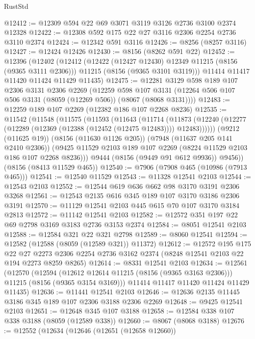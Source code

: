 \begin{lexlean}{RustStd}
\begin{coremodule}
{\begin{coremodule}
{{{{{{{{{{{{{{{{{{{{{{{{{{{{{{{{{{@12412 := @12309 @594 @22 @69 @3071 @3119 @3126 @2736 @3100 @2374 @12328
@12422 := @12308 @592 @175 @22 @27 @3116 @2306 @2254 @2736 @3110 @2374
@12424 := @12342 @591 @3116
@12426 := @8256 (@8257 @3116)
@12427 := @12424 @12426
@12430 := @8156 (@8262 @591 @22)
@12452 := @12396
    (@12402
      (@12412
        (@12422 (@12427 @12430) @12349 @11215 (@8156 (@9365 @3111 @2306)))
        @11215
        (@8156 (@9365 @3101 @3119)))
      @11414
      @11417
      @11420
      @11424
      @11429
      @11435)
@12475 := @12281
    @3129
    @598
    @189
    @107
    @2306
    @3131
    @2306
    @2269
    (@12259
      @598
      @107
      @3131
      (@12264 @506 @107 @506 @3131 (@8059 (@12269 @506)) (@8067 (@8068 @3131))))
@12483 := @12259 @189 @107 @2269 (@12382 @186 @107 @2268 @8236)
@12535 := @11542
    (@11548
      (@11575
        (@11593
          (@11643
            (@11714
              (@11873
                (@12240 (@12277 (@12289 (@12369 (@12388 (@12452 (@12475 @12483)))) @12483))))))
          (@9212 (@11625 @19))
          (@8156 (@11630 @1126 @205))
          (@7948 (@11637 @205 @141 @2410 @2306))
          (@9425 @11529 @2103 @189 @107 @2269 (@8224 @11529 @2103 @186 @107 @2268 @8236)))
        @9444
        (@8156 (@9449 @91 @612 @9936))
        @9456))
    (@8156 (@8413 @11529 @465))
@12540 := @7906 (@7908 @465 (@10986 (@7913 @465)))
@12541 := @12540 @11529
@12543 := @11328 @12541 @2103
@12544 := @12543 @2103
@12552 := @12544 @619 @636 @662 @98 @3170 @3191 @2306 @3268
@12561 := @12543 @2135 @616 @345 @189 @107 @3170 @3186 @2306 @3191
@12570 := @11129 @12541 @2103 @445 @615 @70 @107 @3170 @3184 @2813
@12572 := @11142 @12541 @2103
@12582 := @12572 @351 @197 @22 @69 @2798 @3169 @3183 @2736 @3153 @2374
@12584 := @8051 @12541 @2103
@12588 := @12584 @321 @22 @321 @2798
@12589 := @8060 @12541
@12594 := @12582 (@12588 (@8059 (@12589 @321)) @11372)
@12612 := @12572
    @195
    @175
    @22
    @27
    @2273
    @2306
    @2254
    @2736
    @3162
    @2374
    (@8248 @12541 @2103 @22 @194 @2273 @8259 @8265)
@12614 := @8331 @12541 @2103
@12634 := @12561
    (@12570
      (@12594 (@12612 @12614 @11215 (@8156 (@9365 @3163 @2306))) @11215 (@8156 (@9365 @3154 @3169)))
      @11414
      @11417
      @11420
      @11424
      @11429
      @11435)
@12636 := @11441 @12541 @2103
@12646 := @12636 @2135 @11445 @3186 @345 @189 @107 @2306 @3188 @2306 @2269
@12648 := @9425 @12541 @2103
@12651 := @12648 @345 @107 @3188
@12658 := @12584 @338 @107 @338 @3188 (@8059 (@12589 @338))
@12660 := @8067 (@8068 @3188)
@12676 := @12552
    (@12634
      (@12646
        (@12651 (@12658 @12660))
}}}}}}}}}}}}}}}}}}}}}}}}}}}}}}}}}}
\end{coremodule}}
\end{coremodule}
\end{lexlean}
